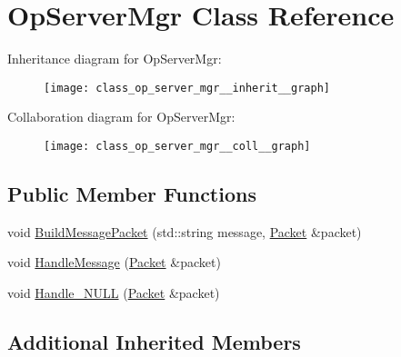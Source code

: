 \hypertarget{class_op_server_mgr}{\section{Op\+Server\+Mgr Class Reference}
\label{class_op_server_mgr}
}


Inheritance diagram for Op\+Server\+Mgr\+:\nopagebreak
\begin{figure}[H]
\begin{center}
\leavevmode
\texttt{[image: class\_op\_server\_mgr\_\_inherit\_\_graph]}
\end{center}
\end{figure}


Collaboration diagram for Op\+Server\+Mgr\+:\nopagebreak
\begin{figure}[H]
\begin{center}
\leavevmode
\texttt{[image: class\_op\_server\_mgr\_\_coll\_\_graph]}
\end{center}
\end{figure}
\subsection*{Public Member Functions}
\begin{DoxyCompactItemize}
\item 
void \hyperlink{class_op_server_mgr_acd3b202d791b6dd8146eef39786997af}{Build\+Message\+Packet} (std\+::string message, \hyperlink{class_agmd_network_1_1_packet}{Packet} \&packet)
\item 
void \hyperlink{class_op_server_mgr_aef6c896482ea23f11a147facbb0e59cd}{Handle\+Message} (\hyperlink{class_agmd_network_1_1_packet}{Packet} \&packet)
\item 
void \hyperlink{class_op_server_mgr_a039481f8c88d095c163701495efe39a9}{Handle\+\_\+\+N\+U\+L\+L} (\hyperlink{class_agmd_network_1_1_packet}{Packet} \&packet)
\end{DoxyCompactItemize}
\subsection*{Additional Inherited Members}


